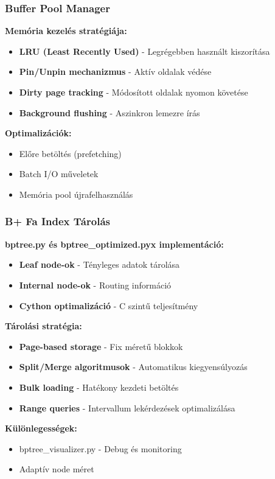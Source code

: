 \documentclass{beamer}
\begin{document}
\begin{frame}
\frametitle{Buffer Pool Manager}

\textbf{Memória kezelés stratégiája:}
\begin{itemize}
    \item \textbf{LRU (Least Recently Used)} - Legrégebben használt kiszorítása
    \item \textbf{Pin/Unpin mechanizmus} - Aktív oldalak védése
    \item \textbf{Dirty page tracking} - Módosított oldalak nyomon követése
    \item \textbf{Background flushing} - Aszinkron lemezre írás
\end{itemize}

\vspace{0.5cm}
\textbf{Optimalizációk:}
\begin{itemize}
    \item Előre betöltés (prefetching)
    \item Batch I/O műveletek
    \item Memória pool újrafelhasználás
\end{itemize}

\end{frame}

\begin{frame}
\frametitle{B+ Fa Index Tárolás}

\textbf{bptree.py és bptree\_optimized.pyx implementáció:}
\begin{itemize}
    \item \textbf{Leaf node-ok} - Tényleges adatok tárolása
    \item \textbf{Internal node-ok} - Routing információ
    \item \textbf{Cython optimalizáció} - C szintű teljesítmény
\end{itemize}

\vspace{0.3cm}
\textbf{Tárolási stratégia:}
\begin{itemize}
    \item \textbf{Page-based storage} - Fix méretű blokkok
    \item \textbf{Split/Merge algoritmusok} - Automatikus kiegyensúlyozás
    \item \textbf{Bulk loading} - Hatékony kezdeti betöltés
    \item \textbf{Range queries} - Intervallum lekérdezések optimalizálása
\end{itemize}

\vspace{0.3cm}
\textbf{Különlegességek:}
\begin{itemize}
    \item bptree\_visualizer.py - Debug és monitoring
    \item Adaptív node méret
\end{itemize}

\end{frame}
\end{document}
